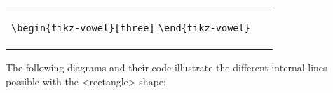 \documentclass{article}
\def\\{}%
\def\texttt#1{<#1>}%
\begin{document}
\begin{center}
\begin{tabular}{ll}
  \begin{minipage}[t]{6.5cm}{\small
    \verb|\begin{tikz-vowel}[three]|\\
    \verb|\end{tikz-vowel}|\\}
  \end{minipage} & 
  \begin{minipage}[t]{6.5cm}
  {~}
  \end{minipage} \\
  \begin{minipage}[t]{6.5cm}{
  \begin{tikz-vowel}[three]\end{tikz-vowel} \\}\end{minipage} &
\end{tabular}
\end{center}

\noindent
The following diagrams and their code illustrate the different internal lines possible with the \texttt{rectangle} shape:
\end{document}
